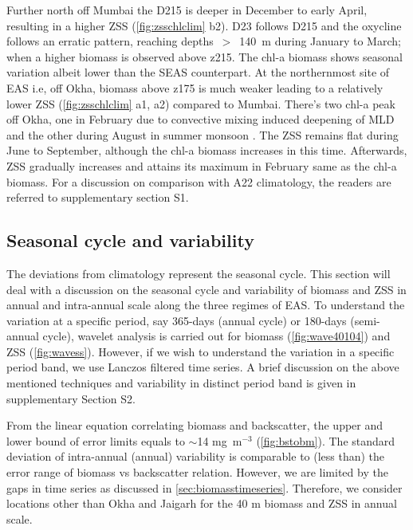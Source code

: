 \documentclass{article}
\begin{document}
	Further north off Mumbai the D215 is deeper in December to early April, resulting in a higher ZSS (\cref{fig:zsschlclim} b2). D23 follows D215 and the oxycline follows an erratic pattern, reaching depths~$>$~140~m during January to March; when a higher biomass is observed above z215. The chl-a biomass shows seasonal variation albeit lower than the SEAS counterpart. At the northernmost site of EAS i.e, off Okha, biomass above z175 is much weaker leading to a relatively lower ZSS (\cref{fig:zsschlclim} a1, a2) compared to Mumbai.  There's two chl-a peak off Okha, one in February due to convective mixing induced deepening of MLD \citep{wiggert2005monsoon,levy2007basin,keerthi2017physical,shankar2016inhibition} and the other during August in summer monsoon \citep{wiggert2005monsoon,levy2007basin}. The ZSS remains flat during June to September, although the chl-a biomass increases in this time.  Afterwards, ZSS gradually increases and attains its maximum in February same as the chl-a biomass. For a discussion on comparison with A22 climatology, the readers are referred to supplementary section S1.
	 
	\subsection{Seasonal cycle and variability}
	\label{sec:seasonalcyclezss}
	The deviations from climatology represent the seasonal cycle. This section will deal with a discussion on the seasonal cycle and variability of biomass and ZSS in annual and intra-annual scale along the three regimes of EAS. To understand the variation at a specific period, say 365-days (annual cycle) or 180-days (semi-annual cycle), wavelet analysis is carried out for biomass (\cref{fig:wave40104}) and ZSS (\cref{fig:wavess}). However, if we wish to understand the variation in a specific period band, we use Lanczos filtered time series. A brief discussion on the above mentioned techniques and variability in distinct period band is given in supplementary Section S2. 
	
	From the linear equation correlating biomass and backscatter, the upper and lower bound of error limits equals to $\sim$14 mg~m$^{-3}$ (\cref{fig:bstobm}). The standard deviation of intra-annual (annual) variability is comparable to (less than) the error range of biomass vs backscatter relation. However, we are limited by the gaps in time series as discussed in \autoref{sec:biomasstimeseries}. Therefore, we consider locations other than Okha and Jaigarh for the 40 m biomass and ZSS in annual scale. 
	
\end{document}
